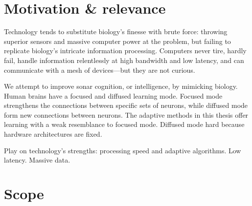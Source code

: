 {\section{Motivation \& relevance}

Technology tends to substitute biology's finesse with brute force: throwing superior sensors and massive computer power at the problem, but failing to replicate biology's intricate information processing. Computers never tire, hardly fail, handle information relentlessly at high bandwidth and low latency, and can communicate with a mesh of devices---but they are not curious.


We attempt to improve sonar cognition, or intelligence, by mimicking biology. Human brains have a focused and diffused learning mode. Focused mode strengthens the connections between specific sets of neurons, while diffused mode form new connections between neurons. The adaptive methods in this thesis offer learning with a weak resemblance to focused mode. Diffused mode hard because hardware architectures are fixed. 


Play on technology's strengths: processing speed and adaptive algorithms. Low latency. Massive data. 

% 
%

%
%
%
%
%


%
%

\section{Scope}


}
